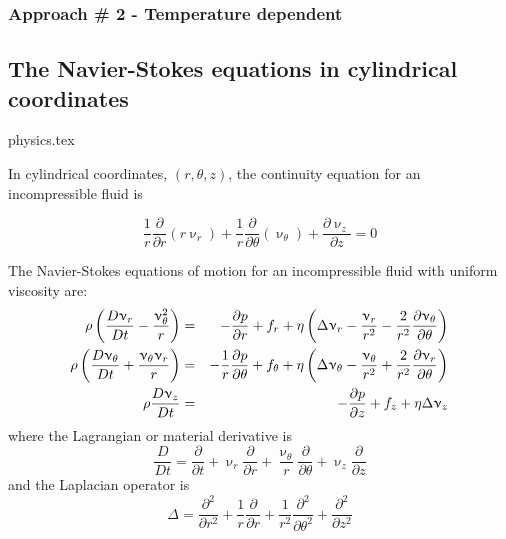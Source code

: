 \subsubsection{Approach \# 2 - Temperature dependent \label{ss:dimeqs2}}




\subsection{The Navier-Stokes equations in cylindrical coordinates}
\begin{flushright} {\tiny {\color{gray} physics.tex}} \end{flushright}

In cylindrical coordinates, $(r,\theta,z)$, the continuity equation for an incompressible fluid is 
\begin{mdframed}[backgroundcolor=blue!5]
\begin{equation}
\frac{1}{r} \frac{\partial}{\partial r} (r \upnu_r) + 
\frac{1}{r} \frac{\partial}{\partial \theta} (\upnu_\theta) + 
\frac{\partial \upnu_z}{\partial z} =0
\end{equation}
\end{mdframed}
The Navier-Stokes equations of motion for an incompressible fluid with uniform viscosity are:
\begin{eqnarray}
\rho \left(  \frac{D\upnu_r}{Dt} -\frac{\upnu_\theta^2}{r} \right) 
&=& -\frac{\partial p}{\partial r} + f_r + \eta
\left( \Delta \upnu_r - \frac{\upnu_r}{r^2} - \frac{2}{r^2} \frac{\partial \upnu_\theta}{\partial \theta}
\right)
\nonumber\\
\rho \left(  \frac{D\upnu_\theta}{Dt} +\frac{\upnu_\theta \upnu_r}{r} \right) 
&=&
-\frac{1}{r} \frac{\partial p}{\partial \theta} + f_\theta + \eta
\left(
\Delta \upnu_\theta - \frac{\upnu_\theta}{r^2} + \frac{2}{r^2} \frac{\partial \upnu_r}{\partial\theta}
\right)
\nonumber\\
\rho \frac{D\upnu_z}{Dt} 
&=& 
-\frac{\partial p}{\partial z} + f_z + \eta \Delta \upnu_z
\end{eqnarray}
where the Lagrangian or material derivative is
\[
\frac{D}{Dt} = \frac{\partial}{\partial t} 
+ \upnu_r \frac{\partial}{\partial r}  
+ \frac{\upnu_\theta}{r} \frac{\partial}{\partial \theta}
+ \upnu_z \frac{\partial}{\partial z}  
\]
and the Laplacian operator is   
\begin{equation}
\Delta 
= \frac{\partial^2 }{\partial r^2}  +\frac{1}{r} \frac{\partial }{\partial r}
+ \frac{1}{r^2}  \frac{\partial^2}{\partial \theta^2}
+ \frac{\partial^2 }{\partial z^2}
\end{equation}


